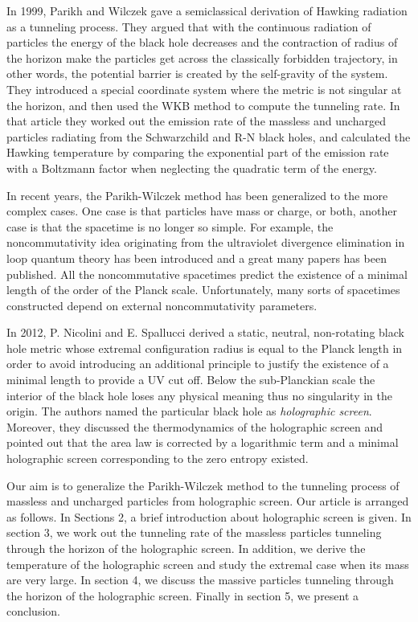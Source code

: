 \documentclass[12pt]{article}
\begin{document}
In 1999, Parikh and Wilczek \cite{PARIKH1,PARIKH2} gave a semiclassical derivation of Hawking radiation as a tunneling process. They argued that with the continuous radiation  of particles  the energy of the black hole
decreases and the contraction of radius  of the horizon  make the particles get across the classically forbidden trajectory,  in other words, the potential barrier is created by the self-gravity of the system.
They introduced a special coordinate system where  the metric is not singular at the horizon, and then used the WKB method to compute the tunneling rate. In that article they worked out the emission rate of the massless and uncharged particles radiating from the
Schwarzchild and R-N black holes, and calculated the Hawking temperature by comparing the exponential part of the emission rate with a Boltzmann factor when neglecting the quadratic term of the energy.

In recent years, the Parikh-Wilczek method has been generalized to the more complex cases. One case is that particles have mass or charge, or both, another case is that the spacetime is no longer so simple. For example, the noncommutativity idea \cite{SEIBERG} originating from the ultraviolet divergence elimination in loop quantum theory\cite{SNYDER} has been introduced and a great many papers has been published\cite{NCPAPERS}. All the noncommutative spacetimes predict the existence of a minimal length of the order of the Planck scale. Unfortunately, many sorts of spacetimes constructed depend on external noncommutativity parameters.

In 2012, P. Nicolini and E. Spallucci\cite{NICOLINISSS1,NICOLINISS2} derived a static, neutral, non-rotating black hole metric whose extremal configuration radius is  equal to the Planck length in order to avoid introducing an additional principle to justify the existence of  a minimal length to provide a UV cut off.  Below the sub-Planckian scale the interior of the black hole loses any physical meaning thus no singularity in the origin. The authors named the particular black hole
as \emph{holographic screen}. Moreover, they discussed the thermodynamics of the holographic screen and pointed out that the area law is corrected by a logarithmic term and a minimal holographic screen corresponding to
the zero entropy existed.

Our aim is to generalize the Parikh-Wilczek method to the tunneling process of massless and uncharged particles from  holographic screen. Our article is arranged as follows. In Sections 2, a brief introduction about holographic screen is given. In section 3, we work out the tunneling rate of the massless  particles tunneling through the horizon of the holographic screen. In addition, we derive the temperature of the holographic screen and study the extremal case when its mass are very large. In section 4, we discuss the massive particles tunneling through the horizon of the holographic screen. Finally in section 5, we present a conclusion.
\\
\\
\\
\\
\end{document}
